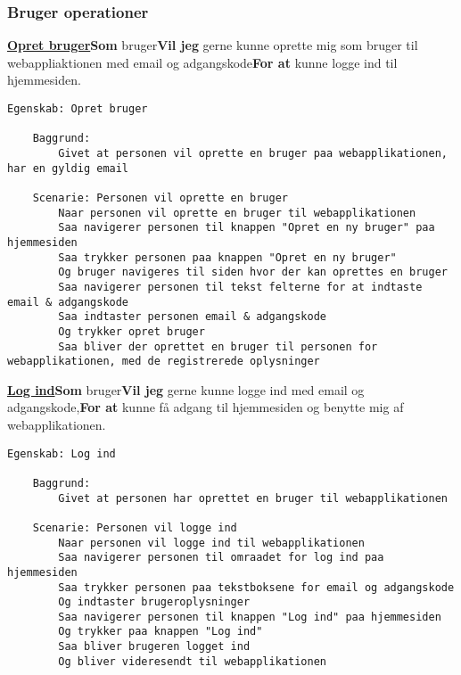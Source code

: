 \subsubsection{Bruger operationer}
\noindent \textbf{\underline{Opret bruger}}\newline \textbf{Som} bruger\newline \textbf{Vil jeg} gerne kunne oprette mig som bruger til webappliaktionen med email og adgangskode\newline \textbf{For at} kunne logge ind til hjemmesiden. 

\begin{lstlisting}[language=Gherkin]
Egenskab: Opret bruger
    
    Baggrund:
        Givet at personen vil oprette en bruger paa webapplikationen, har en gyldig email
        
	Scenarie: Personen vil oprette en bruger
		Naar personen vil oprette en bruger til webapplikationen
		Saa navigerer personen til knappen "Opret en ny bruger" paa hjemmesiden
		Saa trykker personen paa knappen "Opret en ny bruger"
		Og bruger navigeres til siden hvor der kan oprettes en bruger
		Saa navigerer personen til tekst felterne for at indtaste email & adgangskode
		Saa indtaster personen email & adgangskode
		Og trykker opret bruger
		Saa bliver der oprettet en bruger til personen for webapplikationen, med de registrerede oplysninger
\end{lstlisting}

\noindent \textbf{\underline{Log ind}}\newline \textbf{Som} bruger\newline \textbf{Vil jeg} gerne kunne logge ind med email og adgangskode,\newline \textbf{For at} kunne få adgang til hjemmesiden og benytte mig af webapplikationen.

\begin{lstlisting}[language=Gherkin]
Egenskab: Log ind

    Baggrund:
        Givet at personen har oprettet en bruger til webapplikationen
        
	Scenarie: Personen vil logge ind
		Naar personen vil logge ind til webapplikationen
		Saa navigerer personen til omraadet for log ind paa hjemmesiden
		Saa trykker personen paa tekstboksene for email og adgangskode
		Og indtaster brugeroplysninger 
		Saa navigerer personen til knappen "Log ind" paa hjemmesiden
		Og trykker paa knappen "Log ind"
		Saa bliver brugeren logget ind 
		Og bliver videresendt til webapplikationen 
\end{lstlisting}

